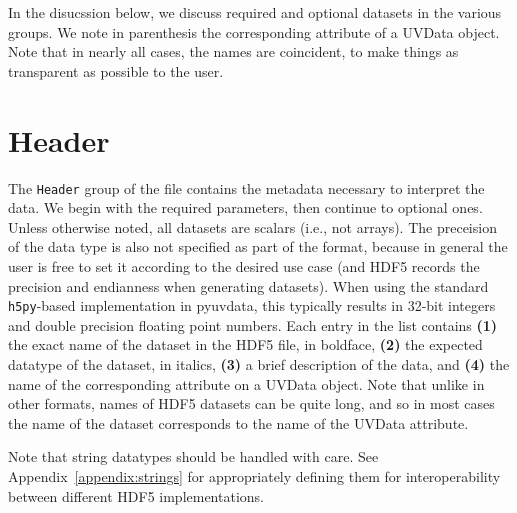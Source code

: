 \documentclass[11pt, oneside]{article}
\begin{document}
In the disucssion below, we discuss required and optional datasets in the
various groups. We note in parenthesis the corresponding attribute of a UVData
object. Note that in nearly all cases, the names are coincident, to make things
as transparent as possible to the user.

\section{Header}
\label{sec:header}
The \verb+Header+ group of the file contains the metadata necessary to interpret
the data. We begin with the required parameters, then continue to optional
ones. Unless otherwise noted, all datasets are scalars (i.e., not arrays). The
preceision of the data type is also not specified as part of the format, because
in general the user is free to set it according to the desired use case (and
HDF5 records the precision and endianness when generating datasets). When using
the standard \verb+h5py+-based implementation in pyuvdata, this typically
results in 32-bit integers and double precision floating point numbers. Each
entry in the list contains \textbf{(1)} the exact name of the dataset in the
HDF5 file, in boldface, \textbf{(2)} the expected datatype of the dataset, in
italics, \textbf{(3)} a brief description of the data, and \textbf{(4)} the name
of the corresponding attribute on a UVData object. Note that unlike in other
formats, names of HDF5 datasets can be quite long, and so in most cases the name
of the dataset corresponds to the name of the UVData attribute.

Note that string datatypes should be handled with care. See
Appendix~\ref{appendix:strings} for appropriately defining them for
interoperability between different HDF5 implementations.
\end{document}
